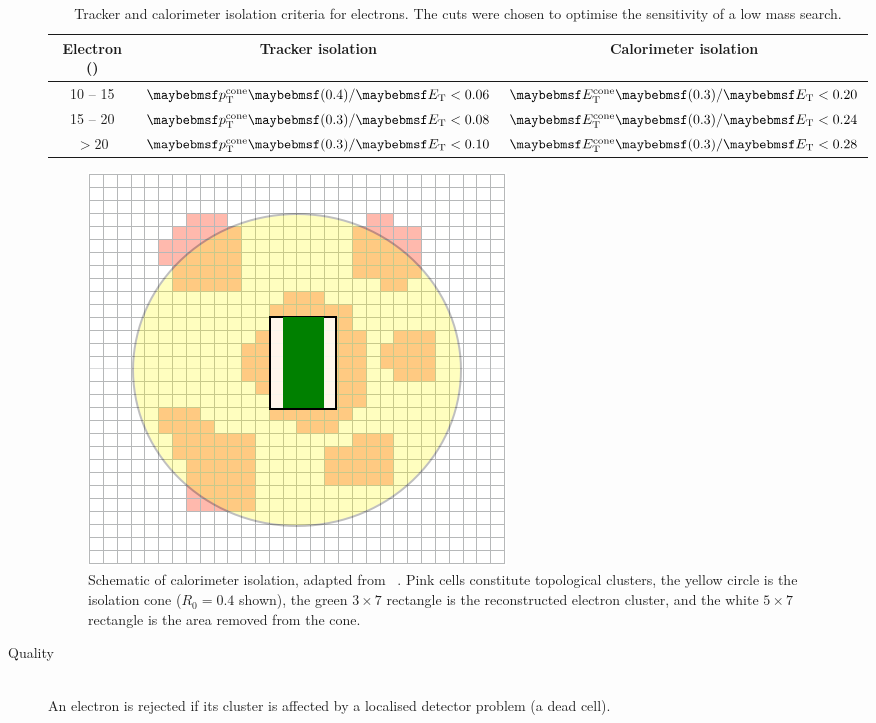 \begin{description}
	\begin{table}[t]
		\begin{tabular}{c@{\hskip 0.3in}c@{\hskip 0.3in}c}
			\toprule
			Electron \et (\GeV) & Tracker isolation & Calorimeter isolation \\
			\midrule
			10 -- 15 & $\ptcone{0.4}/\et < 0.06$ & $\etcone{0.3}/\et < 0.20$ \\
			15 -- 20 & $\ptcone{0.3}/\et < 0.08$ & $\etcone{0.3}/\et < 0.24$ \\
			$> 20$   & $\ptcone{0.3}/\et < 0.10$ & $\etcone{0.3}/\et < 0.28$ \\
			\bottomrule
		\end{tabular}
		\caption{Tracker and calorimeter isolation criteria for electrons. The cuts 
		were chosen to optimise the sensitivity of a low mass \HWWlvlv search.}
		\label{tab:objects:el_iso}
	\end{table}

	\begin{figure}[t]
		\includegraphics[width=0.8\smallfigwidth]{tex/selection/el_isolation}
		\caption{Schematic of calorimeter isolation, adapted from 
		\Reference~\cite{ATLAS:isolation}. Pink cells constitute topological 
		clusters, the yellow circle is the isolation cone ($R_0 = 0.4$ shown), the green 
		$3 \times 7$ rectangle is the reconstructed electron cluster, and the white 
		$5 \times 7$ rectangle is the area removed from the cone.}
		\label{fig:objects:el_iso}
	\end{figure}

\item[Quality] \hfill \\
	An electron is rejected if its cluster is affected by a localised detector problem 
	(\eg a dead cell).


\end{description}
